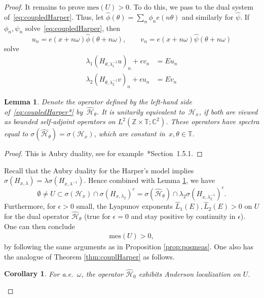\documentclass[11pt]{amsart}
\newtheorem{lemma}[theorem]{Lemma}
\newtheorem{corollary}[theorem]{Corollary}
\newcommand{\Z}{\mathbb Z}
\newcommand{\C}{\mathbb C}
\def\calH{\mathcal{H}}
\def\tor{\mathbb{T}}
\begin{document}
\begin{proof}
    It remains to prove $\mathrm{mes}(U)>0$. 
    To do this, we pass to the dual system of~\eqref{eq:coupledHarper}.  Thus, let $\hat{\phi}(\theta)=\sum_n \phi_n e(n\theta)$ and similarly for $\hat{\psi}$. If $\phi_n,\psi_n$ solve~\eqref{eq:coupledHarper}, then 
    \[
    u_n = e(x+n\omega) \hat{\phi}(\theta+n\omega),\qquad v_n = e(x+n\omega) \hat{\psi}(\theta+n\omega)
    \]
    solve
    \begin{equation}
     \label{eq:coupledHarper*}
     \begin{split}
          \lambda_1(H_{\theta,\lambda_1^{-1}}u)_n+\epsilon v_n &= E u_n \\
     \lambda_2(H_{\theta,\lambda_2^{-1}}v)_n+\epsilon u_n&= Ev_n
     \end{split}
\end{equation}




\begin{lemma}
    \label{lem:Aubry}
    Denote the operator defined by the left-hand side of~\eqref{eq:coupledHarper*} by~$\widehat{\calH}_\theta$. It is unitarily equivalent to~$\calH_x$, if both are viewed as bounded self-adjoint operators on $L^2(\Z\times\tor;\C^2)$. These operators have spectra equal to $\sigma(\widehat{\calH}_\theta)=\sigma(\calH_x)$, which are constant in~$x,\theta\in\tor$. 
\end{lemma}
\begin{proof}
    This is Aubry duality, see for example~\cite{HP}*{Section~1.5.1}. 
\end{proof}
Recall that the Aubry duality for the Harper's model implies $\sigma(H_{x,\lambda})=\lambda \sigma(H_{x,\lambda^{-1}})$. Hence combined with Lemma \ref{lem:Aubry}, we have
\[\emptyset\neq U\subset \sigma(\calH_x)\cap \sigma(H_{x,\lambda_2})^c=\sigma(\widehat{\calH}_{\theta})\cap \lambda_2\sigma(H_{x,\lambda_2^{-1}})^c.\]
Furthermore, for $\epsilon>0$ small, the Lyapunov exponents $\hat{L}_1(E),\hat{L}_2(E)>0$ on $U$ for the dual operator $\widehat{\calH}_{\theta}$ (true for $\epsilon=0$ and stay positive by continuity in $\epsilon$).
One can then conclude 
\begin{align}\label{eq:mes_U>0}
    \mathrm{mes}(U)>0,
\end{align} 
by following the same arguments as in  Proposition \ref{prop:posmeas}.
One also has the analogue of Theorem \ref{thm:couplHarper} as follows.
 \begin{corollary}
     \label{cor:dualAL}
For a.e.~$\omega$, the operator $\widehat{\calH}_0$ exhibits Anderson localization on $U$. 
 \end{corollary}


\end{proof}
\end{document}
